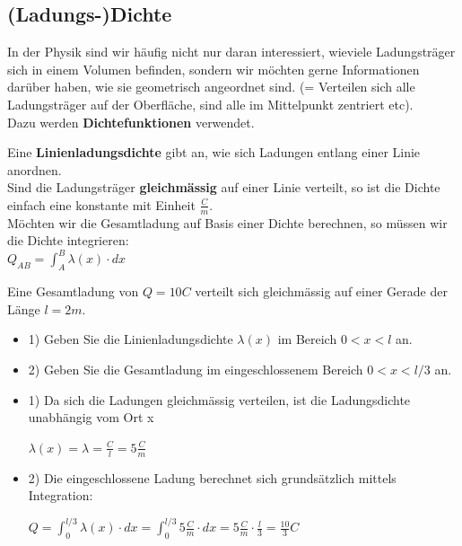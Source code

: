 \subsection{(Ladungs-)Dichte}
In der Physik sind wir häufig nicht nur daran interessiert, wieviele Ladungsträger sich in einem Volumen befinden, sondern wir möchten gerne Informationen darüber haben, wie sie geometrisch angeordnet sind. (= Verteilen sich alle Ladungsträger auf der Oberfläche, sind alle im Mittelpunkt zentriert etc). \\
Dazu werden \textbf{Dichtefunktionen} verwendet.

\beginip
Eine \textbf{Linienladungsdichte} gibt an, wie sich Ladungen entlang einer Linie anordnen. \\
Sind die Ladungsträger \textbf{gleichmässig} auf einer Linie verteilt, so ist die Dichte einfach eine konstante mit Einheit $\frac{C}{m}$. \\
Möchten wir die Gesamtladung auf Basis einer Dichte berechnen, so müssen wir die Dichte integrieren: \\
\formulaBegin
$\displaystyle Q_{AB} = \int_A^B \lambda (x) \cdot dx$
\formulaEnd
\iend

\beginbsp
Eine Gesamtladung von $Q=10C$ verteilt sich gleichmässig auf einer Gerade der Länge $l = 2m$. \\
\begin{itemize}
	\item 1) Geben Sie die Linienladungsdichte $\lambda(x)$ im Bereich $ 0 < x <l$ an.
	\item 2) Geben Sie die Gesamtladung im eingeschlossenem Bereich $ 0 < x < l/3$ an.
\end{itemize}
\iend

\newpage
{}
\beginbsp
\begin{itemize}
	\item 1) Da sich die Ladungen gleichmässig verteilen, ist die Ladungsdichte unabhängig vom Ort x
	      \begin{center}
	      	$\lambda(x) = \lambda = \frac{C}{l} = 5 \frac{C}{m}$
	      \end{center}
	\item 2) Die eingeschlossene Ladung berechnet sich grundsätzlich mittels Integration:
	      \begin{center}
	      	$\displaystyle Q = \int_0^{l/3} \lambda(x) \cdot dx = \int_0^{l/3} 5 \frac{C}{m} \cdot dx = 5 \frac{C}{m} \cdot \frac{l}{3} = \frac{10}{3} C$
	      \end{center}
\end{itemize}
\iend









